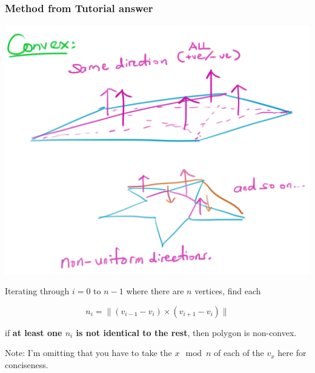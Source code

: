 \documentclass{beamer}
\begin{document}
\begin{frame}
    \frametitle{Method from Tutorial answer}

    \begin{center}
        \includegraphics[scale=0.2]{convex.png}
    \end{center}

    Iterating through $i = 0$ to $n-1$ where there are $n$ vertices, find each

    $$
    n_i = \|(v_{i-1} - v_{i}) \times (v_{i+1} - v_{i})\|
    $$
    
    if \textbf{at least one $n_i$ is not identical to the rest}, then polygon is non-convex.

    {\tiny Note: I'm omitting that you have to take the $x\mod n$ of each of the $v_x$ here for conciseness. }
    
\end{frame}
\end{document}
